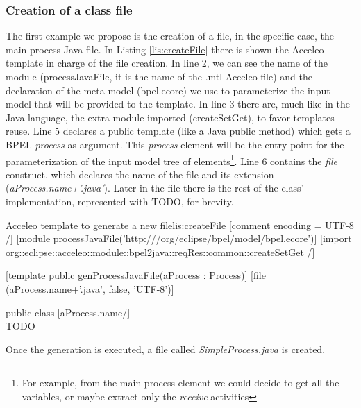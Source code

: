 \subsubsection{Creation of a class file}
The first example we propose is the creation of a file, in the specific case, the main process Java file.
In Listing \ref{lis:createFile} there is shown the Acceleo template in charge of the file creation. In line 2, we can see the name of the module (processJavaFile, it is the name of the .mtl Acceleo file) and the declaration of the meta-model (bpel.ecore) we use to parameterize the input model that will be provided to the template.
In line 3 there are, much like in the Java language, the extra module imported (createSetGet), to favor templates reuse. Line 5 declares a public template (like a Java public method) which gets a BPEL \textit{process} as argument.
This \textit{process} element will be the entry point for the parameterization of the input model tree of elements\footnote{For example, from the main process element we could decide to get all the variables, or maybe extract only the \textit{receive} activities}. Line 6 contains the \textit{file} construct, which declares the name of the file and its extension (\textit{aProcess.name+'.java'}). Later in the file there is the rest of the class' implementation, represented with TODO, for brevity.

\begin{center}
  \begin{minipage}{1\textwidth}
    \begin{java-code}{Acceleo template to generate a new file}{lis:createFile}
[comment encoding = UTF-8 /]
[module processJavaFile('http:///org/eclipse/bpel/model/bpel.ecore')]
[import org::eclipse::acceleo::module::bpel2java::reqRes::common::createSetGet /]

[template public genProcessJavaFile(aProcess : Process)]
[file (aProcess.name+'.java', false, 'UTF-8')]

public class [aProcess.name/] {
    \\ TODO 
}
    \end{java-code}
  \end{minipage}
\end{center}

Once the generation is executed, a file called \textit{SimpleProcess.java} is created.

